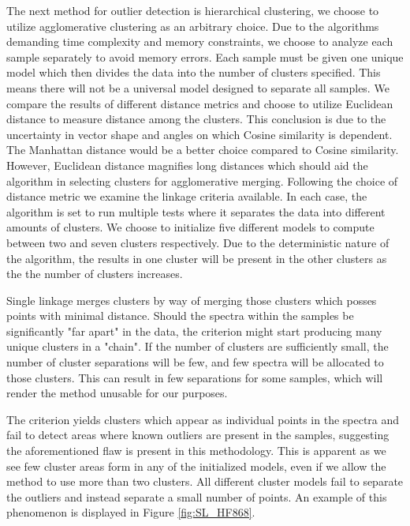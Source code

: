 The next method for outlier detection is hierarchical clustering, we choose to utilize agglomerative clustering as an arbitrary choice. Due to the algorithms demanding time complexity and memory constraints, we choose to analyze each sample separately to avoid memory errors. Each sample must be given one unique model which then divides the data into  the number of clusters specified. This means there will not be a universal model designed to separate all samples. We compare the results of different distance metrics and choose to utilize Euclidean distance to measure distance among the clusters. This conclusion is due to the uncertainty in vector shape and angles on which Cosine similarity is dependent. The Manhattan distance would be a better choice compared to Cosine similarity. However, Euclidean distance magnifies long distances which should aid the algorithm in selecting clusters for agglomerative merging. Following the choice of distance metric we examine the linkage criteria available. In each case, the algorithm is set to run multiple tests where it separates the data into different amounts of clusters. We choose to initialize five different models to compute between two and seven clusters respectively. Due to the deterministic nature of the algorithm, the results in one cluster will be present in the other clusters as the the number of clusters increases.

Single linkage merges clusters by way of merging those clusters which posses points with minimal distance. Should the spectra within the samples be significantly "far apart" in the data, the criterion might start producing many unique clusters in a "chain". If the number of clusters are sufficiently small, the number of cluster separations will be few, and few spectra will be allocated to those clusters. This can result in few separations for some samples, which will render the method unusable for our purposes.

The criterion yields clusters which appear as individual points in the spectra and fail to detect areas where known outliers are present in the samples, suggesting the aforementioned flaw is present in this methodology. This is apparent as we see few cluster areas form in any of the initialized models, even if we allow the method to use more than two clusters. All different cluster models fail to separate the outliers and instead separate a small number of points. An example of this phenomenon is displayed in Figure \ref{fig:SL_HF868}.

